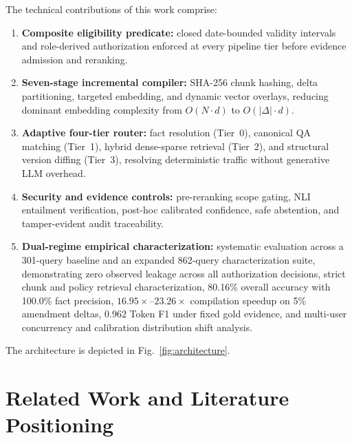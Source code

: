 \documentclass[journal]{IEEEtran}
\begin{document}
The technical contributions of this work comprise:
\begin{enumerate}\setlength{\itemsep}{0pt}\setlength{\parsep}{0pt}\setlength{\topsep}{0.5pt}
  \item \textbf{Composite eligibility predicate:} closed date-bounded validity intervals and role-derived authorization enforced at every pipeline tier before evidence admission and reranking.
  \item \textbf{Seven-stage incremental compiler:} SHA-256 chunk hashing, delta partitioning, targeted embedding, and dynamic vector overlays, reducing dominant embedding complexity from $O(N\cdot d)$ to $O(|\Delta|\cdot d)$.
  \item \textbf{Adaptive four-tier router:} fact resolution (Tier~0), canonical QA matching (Tier~1), hybrid dense-sparse retrieval (Tier~2), and structural version diffing (Tier~3), resolving deterministic traffic without generative LLM overhead.
  \item \textbf{Security and evidence controls:} pre-reranking scope gating, NLI entailment verification, post-hoc calibrated confidence, safe abstention, and tamper-evident audit traceability.
  \item \textbf{Dual-regime empirical characterization:} systematic evaluation across a 301-query baseline and an expanded 862-query characterization suite, demonstrating zero observed leakage across all authorization decisions, strict chunk and policy retrieval characterization, 80.16\% overall accuracy with 100.0\% fact precision, $16.95\times$--$23.26\times$ compilation speedup on 5\% amendment deltas, $0.962$ Token F1 under fixed gold evidence, and multi-user concurrency and calibration distribution shift analysis.
\end{enumerate}

The architecture is depicted in Fig.~\ref{fig:architecture}.

\section{Related Work and Literature Positioning}
\end{document}
